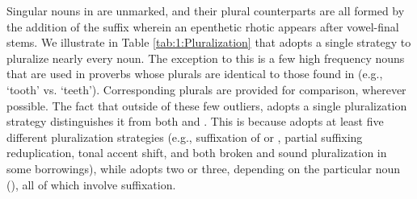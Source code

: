 \documentclass[output=paper]{LSP/langsci}
\begin{document}
 Singular nouns in  are unmarked, and their plural counterparts are all formed by the addition of the suffix  wherein an epenthetic rhotic appears after vowel-final stems. We illustrate in Table \ref{tab:1:Pluralization} that  adopts a single strategy to pluralize nearly every noun. The exception to this is a few high frequency nouns that are used in proverbs whose plurals are identical to those found in  (e.g.,  `tooth' vs.  `teeth'). Corresponding  plurals are provided for comparison, wherever possible. The fact that outside of these few outliers,  adopts a single pluralization strategy distinguishes it from both  and . This is because  adopts at least five different pluralization strategies (e.g., suffixation of  or , partial suffixing reduplication, tonal accent shift, and both broken and sound pluralization in some  borrowings), while  adopts two or three, depending on the particular noun (\citealt{Paster2010}), all of which involve suffixation.
 \begin{table}
 	\caption{\textit{Pluralization}}
 	\label{tab:1:Pluralization}
 \end{table}
 
\end{document}
